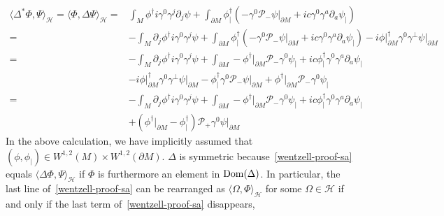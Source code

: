 \begin{equation}\label{wentzell-proof-sa}
\begin{split}
\langle \Delta^*\Phi, \Psi \rangle_\mathcal{H} =
\langle \Phi, \Delta \Psi \rangle _\mathcal{H}
 = & \int_M \phi^\dagger i \gamma^0 \gamma^j \partial_j \psi 
+ \int_{\partial M} \phi^\dagger_|(  -\gamma^0\mathcal{P}_- \psi\vert_{\partial M} + ic \gamma^0 \gamma^a \partial_a\psi_|)   \\
 = & - \int_M \partial_j \phi^\dagger i \gamma^0 \gamma^j \psi 
+ \int_{\partial M} \phi^\dagger_|(-\gamma^0 \mathcal{P}_- \psi\vert_{\partial M} + ic \gamma^0 \gamma^a \partial_a  \psi_|) 
- i\phi\vert_{\partial M}^\dagger \gamma^0 \gamma^\bot \psi\vert_{\partial M}   \\
= &
- \int_M \partial_j \phi^\dagger i \gamma^0 \gamma^j \psi 
+ \int_{\partial M} - \phi^\dagger\vert_{\partial M}\mathcal{P}_- \gamma^0 \psi_| + ic \phi^\dagger_|\gamma^0 \gamma^a \partial_a  \psi_|  \\
& - i \phi\vert_{\partial M}^\dagger \gamma^0 \gamma^\bot \psi\vert_{\partial M} 
-\phi_|^\dagger \gamma^0 \mathcal{P}_- \psi\vert_{\partial M} 
+ \phi^\dagger\vert_{\partial M}\mathcal{P}_- \gamma^0 \psi_| \\
= &
- \int_M \partial_j \phi^\dagger i \gamma^0 \gamma^j \psi 
+ \int_{\partial M} - \phi^\dagger\vert_{\partial M}\mathcal{P}_- \gamma^0 \psi_| + ic \phi^\dagger_|\gamma^0 \gamma^a \partial_a  \psi_| \\
& + (\phi^\dagger\vert_{\partial M} - \phi_|^\dagger)\mathcal{P}_+ \gamma^0 \psi\vert_{\partial M}
\end{split}
\end{equation}
In the above calculation, we have implicitly assumed that $(\phi, \phi_|)\in W^{1,2}(M)\times W^{1,2}(\partial M)$.
$\Delta$ is symmetric because~\cref{wentzell-proof-sa} equals $\langle \Delta\Phi, \Psi\rangle_\mathcal{H}$ if $\Phi$ is furthermore an element in $\mathrm{Dom}(\Delta)$.
In particular, the last line of~\cref{wentzell-proof-sa} can be rearranged as $\langle\Omega,\Phi\rangle_\mathcal{H}$ for some $\Omega\in\mathcal{H}$ if and only if the last term of~\cref{wentzell-proof-sa} disappears, \ie
